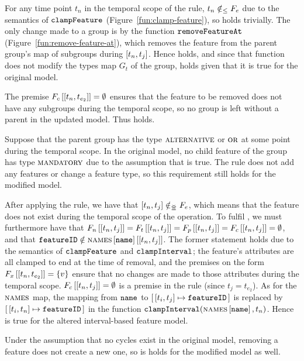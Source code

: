 For any time point $t_n$ in the temporal scope of the rule, $t_n \notin_\leq F_e$ due to the semantics of $\texttt{clampFeature}$ (Figure~\vref{fun:clamp-feature}), so  holds trivially.  The only change made to a group is by the function $\texttt{removeFeatureAt}$ (Figure~\vref{fun:remove-feature-at}), which removes the feature from the parent group's map of subgroups during $\interval{t_n}{t_j}$. Hence  holds, and since that function does not modify the types map $G_t$ of the group,  holds given that it is true for the original model. 

The premise $\lookup{F_c}{\interval{t_n}{t_{e_2}}} = \emptyset$ ensures that the feature to be removed does not have any subgroups during the temporal scope, so no group is left without a parent in the updated model. Thus  holds. 

Suppose that the parent group has the type $\textsc{alternative}{}$ or $\textsc{or}{}$ at some point during the temporal scope. In the original model, no child feature of the group has type $\textsc{mandatory}{}$ due to the assumption that  is true. The  rule does not add any features or change a feature type, so this requirement still holds for the modified model. 

After applying the rule, we have that $\interval{t_n}{t_j} \notinnr F_e$, which means that the feature does not exist during the temporal scope of the operation. To fulfil , we must furthermore have that $\lookup{F_n}{\interval{t_n}{t_j}} = \lookup{F_t}{\interval{t_n}{t_j}}= \lookup{F_p}{\interval{t_n}{t_j}} = \lookup{F_c}{\interval{t_n}{t_j}} = \emptyset$, and that $\var{featureID} \notin \lookup{\lookup{\names}{\var{name}}}{\interval{t_n}{t_j}}$. The former statement holds due to the semantics of $\texttt{clampFeature}$ and $\texttt{clampInterval}$; the feature's attributes are all clamped to end at the time of removal, and the premises on the form $\lookup{F_x}{\interval{t_n}{t_{e_2}}} = \set{v}$ ensure that no changes are made to those attributes during the temporal scope. $\lookup{F_c}{\interval{t_n}{t_j}} = \emptyset$ is a premise in the rule (since $t_j = t_{e_2}$). As for the $\textsc{names}$ map, the mapping from $\texttt{name}$ to $\intervalmapping{t_i}{t_j}{\var{featureID}}$ is replaced by $\intervalmapping{t_i}{t_n}{\var{featureID}}$ in the function $\texttt{clampInterval}(\textsc{names} \left[ \texttt{name} \right], t_n)$. Hence  is true for the altered interval-based feature model.

Under the assumption that no cycles exist in the original model, removing a feature does not create a new one, so  is holds for the modified model as well.
\\

